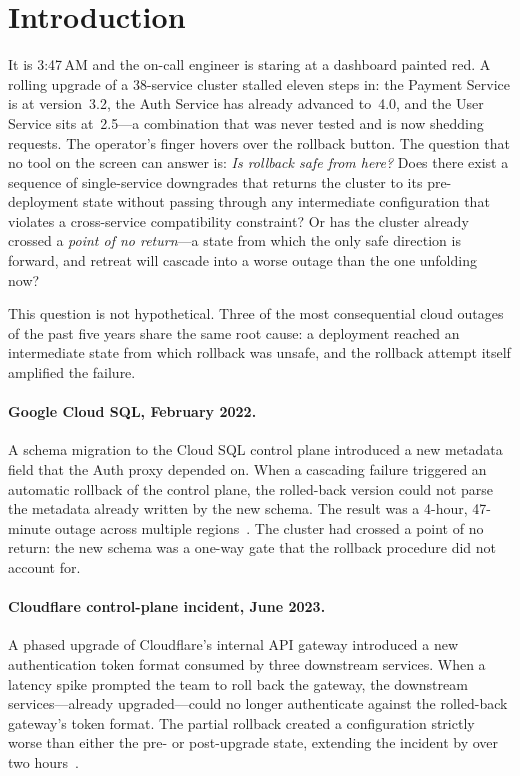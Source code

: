 \documentclass[10pt,twocolumn]{article}
\begin{document}
\section{Introduction}
\label{sec:intro}

It is 3:47\,AM and the on-call engineer is staring at a dashboard painted
red.  A rolling upgrade of a 38-service cluster stalled eleven steps in:
the Payment Service is at version~3.2, the Auth Service has already
advanced to~4.0, and the User Service sits at~2.5---a combination that was
never tested and is now shedding requests.  The operator's finger hovers
over the rollback button.  The question that no tool on the screen can
answer is: \emph{Is rollback safe from here?}  Does there exist a sequence
of single-service downgrades that returns the cluster to its
pre-deployment state without passing through any intermediate configuration
that violates a cross-service compatibility constraint?  Or has the cluster
already crossed a \emph{point of no return}---a state from which the only
safe direction is forward, and retreat will cascade into a worse outage
than the one unfolding now?

This question is not hypothetical.  Three of the most consequential cloud
outages of the past five years share the same root cause: a deployment
reached an intermediate state from which rollback was unsafe, and the
rollback attempt itself amplified the failure.

\paragraph{Google Cloud SQL, February 2022.}
A schema migration to the Cloud SQL control plane introduced a new
metadata field that the Auth proxy depended on.  When a cascading failure
triggered an automatic rollback of the control plane, the rolled-back
version could not parse the metadata already written by the new schema.
The result was a 4-hour, 47-minute outage across multiple
regions~\cite{google-cloudsql-2022}.  The cluster had crossed a point of
no return: the new schema was a one-way gate that the rollback procedure
did not account for.

\paragraph{Cloudflare control-plane incident, June 2023.}
A phased upgrade of Cloudflare's internal API gateway introduced a new
authentication token format consumed by three downstream services.  When a
latency spike prompted the team to roll back the gateway, the downstream
services---already upgraded---could no longer authenticate against the
rolled-back gateway's token format.  The partial rollback created a
configuration strictly worse than either the pre- or post-upgrade state,
extending the incident by over two hours~\cite{cloudflare-2023}.
\end{document}
